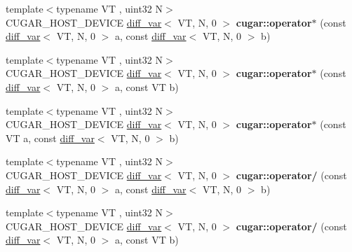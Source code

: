 \begin{DoxyCompactItemize}
\item 
\mbox{\label{group___auto_diff_module_ga9463b835e27894e52b2e92f82fd4deca}} 
{\footnotesize template$<$typename VT , uint32 N$>$ }\\C\+U\+G\+A\+R\+\_\+\+H\+O\+S\+T\+\_\+\+D\+E\+V\+I\+CE \hyperlink{structcugar_1_1diff__var}{diff\+\_\+var}$<$ VT, N, 0 $>$ {\bfseries cugar\+::operator$\ast$} (const \hyperlink{structcugar_1_1diff__var}{diff\+\_\+var}$<$ VT, N, 0 $>$ a, const \hyperlink{structcugar_1_1diff__var}{diff\+\_\+var}$<$ VT, N, 0 $>$ b)
\item 
\mbox{\label{group___auto_diff_module_gab040bc85b808db5b749fe76dd8f5c574}} 
{\footnotesize template$<$typename VT , uint32 N$>$ }\\C\+U\+G\+A\+R\+\_\+\+H\+O\+S\+T\+\_\+\+D\+E\+V\+I\+CE \hyperlink{structcugar_1_1diff__var}{diff\+\_\+var}$<$ VT, N, 0 $>$ {\bfseries cugar\+::operator$\ast$} (const \hyperlink{structcugar_1_1diff__var}{diff\+\_\+var}$<$ VT, N, 0 $>$ a, const VT b)
\item 
\mbox{\label{group___auto_diff_module_gad3487eeff6854d6d2cb53c4f9dce3595}} 
{\footnotesize template$<$typename VT , uint32 N$>$ }\\C\+U\+G\+A\+R\+\_\+\+H\+O\+S\+T\+\_\+\+D\+E\+V\+I\+CE \hyperlink{structcugar_1_1diff__var}{diff\+\_\+var}$<$ VT, N, 0 $>$ {\bfseries cugar\+::operator$\ast$} (const VT a, const \hyperlink{structcugar_1_1diff__var}{diff\+\_\+var}$<$ VT, N, 0 $>$ b)
\item 
\mbox{\label{group___auto_diff_module_ga99a8db723553fd7b545988529b76a67e}} 
{\footnotesize template$<$typename VT , uint32 N$>$ }\\C\+U\+G\+A\+R\+\_\+\+H\+O\+S\+T\+\_\+\+D\+E\+V\+I\+CE \hyperlink{structcugar_1_1diff__var}{diff\+\_\+var}$<$ VT, N, 0 $>$ {\bfseries cugar\+::operator/} (const \hyperlink{structcugar_1_1diff__var}{diff\+\_\+var}$<$ VT, N, 0 $>$ a, const \hyperlink{structcugar_1_1diff__var}{diff\+\_\+var}$<$ VT, N, 0 $>$ b)
\item 
\mbox{\label{group___auto_diff_module_ga81bb22878f326b048ccca48ad794164e}} 
{\footnotesize template$<$typename VT , uint32 N$>$ }\\C\+U\+G\+A\+R\+\_\+\+H\+O\+S\+T\+\_\+\+D\+E\+V\+I\+CE \hyperlink{structcugar_1_1diff__var}{diff\+\_\+var}$<$ VT, N, 0 $>$ {\bfseries cugar\+::operator/} (const \hyperlink{structcugar_1_1diff__var}{diff\+\_\+var}$<$ VT, N, 0 $>$ a, const VT b)

\end{DoxyCompactItemize}
